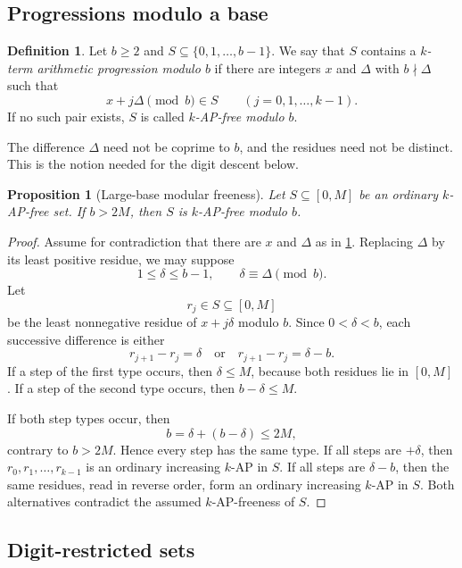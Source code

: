 \documentclass[11pt]{article}
\newtheorem{proposition}[theorem]{Proposition}
\theoremstyle{definition}
\newtheorem{definition}[theorem]{Definition}
\theoremstyle{remark}
\begin{document}
\subsection{Progressions modulo a base}

\begin{definition}\label{def:modular-free}
Let $b\ge 2$ and $S\subseteq\{0,1,\ldots,b-1\}$.  We say that $S$ contains
a \emph{$k$-term arithmetic progression modulo $b$} if there are integers
$x$ and $\Delta$ with $b\nmid\Delta$ such that
\[
 x+j\Delta\pmod b\in S
 \qquad (j=0,1,\ldots,k-1).
\]
If no such pair exists, $S$ is called \emph{$k$-AP-free modulo $b$}.
\end{definition}

The difference $\Delta$ need not be coprime to $b$, and the residues need
not be distinct.  This is the notion needed for the digit descent below.

\begin{proposition}[Large-base modular freeness]\label{prop:large-base}
Let $S\subseteq[0,M]$ be an ordinary $k$-AP-free set.  If $b>2M$, then
$S$ is $k$-AP-free modulo $b$.
\end{proposition}

\begin{proof}
Assume for contradiction that there are $x$ and $\Delta$ as in
\cref{def:modular-free}.  Replacing $\Delta$ by its least positive residue,
we may suppose
\[
 1\le \delta\le b-1,
 \qquad \delta\equiv\Delta\pmod b.
\]
Let
\[
 r_j\in S\subseteq[0,M]
\]
be the least nonnegative residue of $x+j\delta$ modulo $b$.  Since
$0<\delta<b$, each successive difference is either
\[
 r_{j+1}-r_j=\delta
 \quad\text{or}\quad
 r_{j+1}-r_j=\delta-b.
\]
If a step of the first type occurs, then $\delta\le M$, because both
residues lie in $[0,M]$.  If a step of the second type occurs, then
$b-\delta\le M$.

If both step types occur, then
\[
 b=\delta+(b-\delta)\le 2M,
\]
contrary to $b>2M$.  Hence every step has the same type.  If all steps are
$+\delta$, then $r_0,r_1,\ldots,r_{k-1}$ is an ordinary increasing $k$-AP
in $S$.  If all steps are $\delta-b$, then the same residues, read in reverse
order, form an ordinary increasing $k$-AP in $S$.  Both alternatives
contradict the assumed $k$-AP-freeness of $S$.
\end{proof}

\subsection{Digit-restricted sets}
\end{document}
